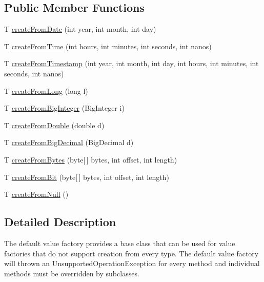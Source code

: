 \subsection*{Public Member Functions}
\begin{DoxyCompactItemize}
\item 
T \mbox{\hyperlink{classcom_1_1mysql_1_1cj_1_1result_1_1_default_value_factory_a7abbef5c2c0a1da994d462bd01bc66ae}{create\+From\+Date}} (int year, int month, int day)
\item 
T \mbox{\hyperlink{classcom_1_1mysql_1_1cj_1_1result_1_1_default_value_factory_af1cd4fa518f703b1eee37b00365f808b}{create\+From\+Time}} (int hours, int minutes, int seconds, int nanos)
\item 
T \mbox{\hyperlink{classcom_1_1mysql_1_1cj_1_1result_1_1_default_value_factory_a826d789263a33a4a914fd4ce07aa44e9}{create\+From\+Timestamp}} (int year, int month, int day, int hours, int minutes, int seconds, int nanos)
\item 
T \mbox{\hyperlink{classcom_1_1mysql_1_1cj_1_1result_1_1_default_value_factory_a051d2bb4762b37e5318c4b12879fee16}{create\+From\+Long}} (long l)
\item 
T \mbox{\hyperlink{classcom_1_1mysql_1_1cj_1_1result_1_1_default_value_factory_ab0c6bdb65a95e8a1459fb64b0fe2a6ae}{create\+From\+Big\+Integer}} (Big\+Integer i)
\item 
T \mbox{\hyperlink{classcom_1_1mysql_1_1cj_1_1result_1_1_default_value_factory_a5a769375b9daa8f06534dec605997715}{create\+From\+Double}} (double d)
\item 
T \mbox{\hyperlink{classcom_1_1mysql_1_1cj_1_1result_1_1_default_value_factory_aaf3123a40d44b5da21e8f0cc7a26142f}{create\+From\+Big\+Decimal}} (Big\+Decimal d)
\item 
T \mbox{\hyperlink{classcom_1_1mysql_1_1cj_1_1result_1_1_default_value_factory_a97d2423b59241620b2e0a519c54b592a}{create\+From\+Bytes}} (byte\mbox{[}$\,$\mbox{]} bytes, int offset, int length)
\item 
T \mbox{\hyperlink{classcom_1_1mysql_1_1cj_1_1result_1_1_default_value_factory_a05b8ff2d9d1c7ff5c6f5b26188a5476c}{create\+From\+Bit}} (byte\mbox{[}$\,$\mbox{]} bytes, int offset, int length)
\item 
T \mbox{\hyperlink{classcom_1_1mysql_1_1cj_1_1result_1_1_default_value_factory_ad19879592d2d343604ceff8f7d6dde84}{create\+From\+Null}} ()
\end{DoxyCompactItemize}


\subsection{Detailed Description}
The default value factory provides a base class that can be used for value factories that do not support creation from every type. The default value factory will thrown an Unsupported\+Operation\+Exception for every method and individual methods must be overridden by subclasses. 

